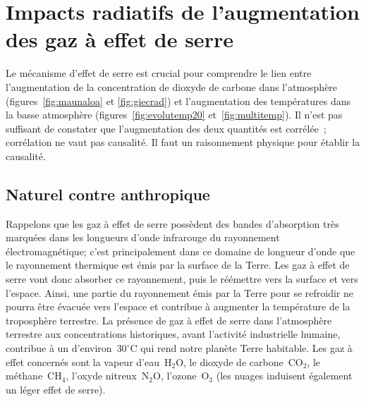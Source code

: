 
\sk
\section{Impacts radiatifs de l'augmentation des gaz à effet de serre}

\sk
Le mécanisme d'effet de serre est crucial pour comprendre le lien entre l'augmentation de la concentration de dioxyde de carbone dans l'atmosphère (figures~\ref{fig:maunaloa} et \ref{fig:giecrad}) et l'augmentation des températures dans la basse atmosphère (figures~\ref{fig:evolutemp20} et~\ref{fig:multitemp}). Il n'est pas suffisant de constater que l'augmentation des deux quantités est corrélée~; corrélation ne vaut pas causalité. Il faut un raisonnement physique pour établir la causalité.

\sk
\subsection{Naturel contre anthropique}

\sk
Rappelons que les gaz à effet de serre possèdent des bandes d'absorption très marquées dans les longueurs d'onde infrarouge du rayonnement électromagnétique; c'est principalement dans ce domaine de longueur d'onde que le rayonnement thermique est émis par la surface de la Terre. Les gaz à effet de serre vont donc absorber ce rayonnement, puis le réémettre vers la surface et vers l'espace. Ainsi, une partie du rayonnement émis par la Terre pour se refroidir ne pourra être évacuée vers l'espace et contribue à augmenter la température de la troposphère terrestre. La présence de gaz à effet de serre dans l'atmosphère terrestre aux concentrations historiques, avant l'activité industrielle humaine, contribue à un  d'environ~$30^{\circ}$C qui rend notre planète Terre habitable. Les gaz à effet concernés sont la vapeur d'eau~H$_2$O, le dioxyde de carbone~CO$_2$, le méthane~CH$_4$, l'oxyde nitreux~N$_2$O, l'ozone~O$_3$ (les nuages induisent également un léger effet de serre). %


